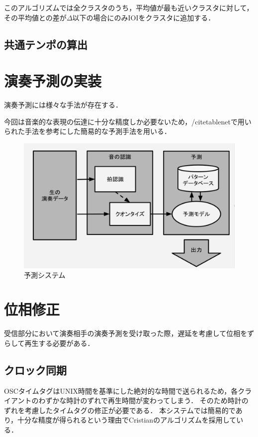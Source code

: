 このアルゴリズムでは全クラスタのうち，平均値が最も近いクラスタに対して，その平均値との差が\(\Delta\)以下の場合にのみIOIをクラスタに追加する．

\subsection{共通テンポの算出}
\section{演奏予測の実装}
演奏予測には様々な手法が存在する．

今回は音楽的な表現の伝達に十分な精度しか必要ないため，/cite{tablenet}で用いられた手法を参考にした簡易的な予測手法を用いる．

\begin{figure}[htbp]
  \centering
  \includegraphics[width=0.8\linewidth]{src/pred.png}
  \caption{予測システム}
  \label{fig:tablenet}
\end{figure}

\section{位相修正}
受信部分において演奏相手の演奏予測を受け取った際，遅延を考慮して位相をずらして再生する必要がある．

\subsection{クロック同期}
OSCタイムタグはUNIX時間を基準にした絶対的な時間で送られるため，各クライアントのわずかな時計のずれで再生時間が変わってしまう．
そのため時計のずれを考慮したタイムタグの修正が必要である．
本システムでは簡易的であり，十分な精度が得られるという理由でCristianのアルゴリズム\cite{cristian}を採用している．


